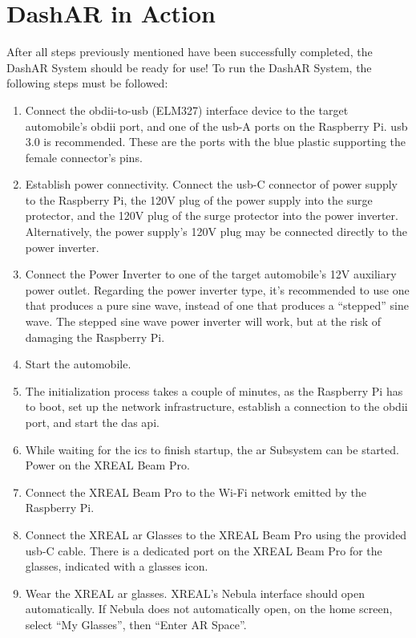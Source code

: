 \section{DashAR in Action}
    \par After all steps previously mentioned have been successfully completed, the DashAR System should be ready for use! To run the DashAR System, the following steps must be followed:

    \begin{enumerate}
        \item Connect the \gls{obdii}-to-\gls{usb} (ELM327) interface device to the target automobile's \gls{obdii} port, and one of the \gls{usb}-A ports on the Raspberry Pi. \gls{usb} 3.0 is recommended. These are the ports with the blue plastic supporting the female connector's pins.
        \item Establish power connectivity. Connect the \gls{usb}-C connector of power supply to the Raspberry Pi, the 120V plug of the power supply into the surge protector, and the 120V plug of the surge protector into the power inverter. Alternatively, the power supply's 120V plug may be connected directly to the power inverter.
        \item Connect the Power Inverter to one of the target automobile's 12V auxiliary power outlet. Regarding the power inverter type, it's recommended to use one that produces a pure sine wave, instead of one that produces a ``stepped'' sine wave. The stepped sine wave power inverter will work, but at the risk of damaging the Raspberry Pi.
        \item Start the automobile.
        \item The initialization process takes a couple of minutes, as the Raspberry Pi has to boot, set up the network infrastructure, establish a connection to the \gls{obdii} port, and start the \gls{das} \gls{api}.
        \item While waiting for the \gls{ics} to finish startup, the \gls{ar} Subsystem can be started. Power on the XREAL Beam Pro.
        \item Connect the XREAL Beam Pro to the Wi-Fi network emitted by the Raspberry Pi.
        \item Connect the XREAL \gls{ar} Glasses to the XREAL Beam Pro using the provided \gls{usb}-C cable. There is a dedicated port on the XREAL Beam Pro for the glasses, indicated with a glasses icon.
        \item Wear the XREAL \gls{ar} glasses. XREAL's Nebula interface should open automatically. If Nebula does not automatically open, on the home screen, select ``My Glasses'', then ``Enter AR Space''.

\end{enumerate}
